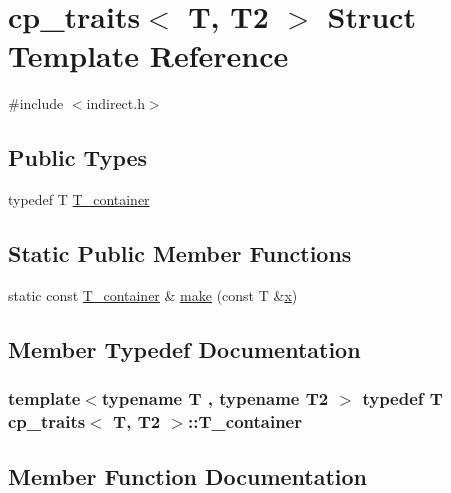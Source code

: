 \hypertarget{structcp__traits}{}\section{cp\+\_\+traits$<$ T, T2 $>$ Struct Template Reference}
\label{structcp__traits}


{\ttfamily \#include $<$indirect.\+h$>$}

\subsection*{Public Types}
\begin{DoxyCompactItemize}
\item 
typedef T \hyperlink{structcp__traits_a5a8225a9268fb84a8095fbe369202848}{T\+\_\+container}
\end{DoxyCompactItemize}
\subsection*{Static Public Member Functions}
\begin{DoxyCompactItemize}
\item 
static const \hyperlink{structcp__traits_a5a8225a9268fb84a8095fbe369202848}{T\+\_\+container} \& \hyperlink{structcp__traits_a653b15abff572f52aedd2be3b9fe96db}{make} (const T \&\hyperlink{vecnorm1_8cc_ac73eed9e41ec09d58f112f06c2d6cb63}{x})
\end{DoxyCompactItemize}


\subsection{Member Typedef Documentation}
\hypertarget{structcp__traits_a5a8225a9268fb84a8095fbe369202848}{}
\subsubsection[{T\+\_\+container}]{\setlength{\rightskip}{0pt plus 5cm}template$<$typename T , typename T2 $>$ typedef T {\bf cp\+\_\+traits}$<$ T, T2 $>$\+::{\bf T\+\_\+container}}\label{structcp__traits_a5a8225a9268fb84a8095fbe369202848}


\subsection{Member Function Documentation}
\hypertarget{structcp__traits_a653b15abff572f52aedd2be3b9fe96db}{}
